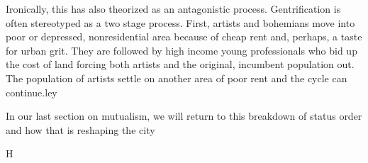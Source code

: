 Ironically, this has also theorized as an antagonistic
process. Gentrification is often stereotyped as a two stage
process. First, artists and bohemians move into poor or depressed,
nonresidential area because of cheap rent and, perhaps, a taste for
urban grit. They are followed by high income young professionals who
bid up the cost of land forcing both artists and the original,
incumbent population out. The population of artists settle on another
area of poor rent and the cycle can continue.{ley}

In our last section on mutualism, we will return to this breakdown of
status order and how that is reshaping the city










H
